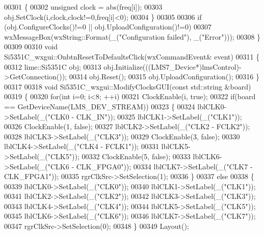 \begin{DoxyCode}
00301     \{
00302         \textcolor{keywordtype}{unsigned} clock = abs(freq[i]);
00303         obj.SetClock(i,clock,clock!=0,freq[i]<0);
00304     \}
00305 
00306     \textcolor{keywordflow}{if} (obj.ConfigureClocks()!=0 || obj.UploadConfiguration()!=0)
00307        wxMessageBox(wxString::Format(\_(\textcolor{stringliteral}{"Configuration failed"}), \_(\textcolor{stringliteral}{"Error"})));
00308 \}
00309 
00310 \textcolor{keywordtype}{void} Si5351C_wxgui::OnbtnResetToDefaultsClick(wxCommandEvent& event)
00311 \{
00312     lime::Si5351C obj;
00313     obj.Initialize(((LMS7_Device*)lmsControl)->GetConnection());
00314     obj.Reset();
00315     obj.UploadConfiguration();
00316 \}
00317 
00318 \textcolor{keywordtype}{void} Si5351C_wxgui::ModifyClocksGUI(\textcolor{keyword}{const} std::string &board)
00319 \{
00320     \textcolor{keywordflow}{for}(\textcolor{keywordtype}{int} i=0; i<8; ++i)
00321         ClockEnable(i, \textcolor{keyword}{true});
00322     \textcolor{keywordflow}{if}(board == GetDeviceName(LMS_DEV_STREAM))
00323     \{
00324         lblCLK0->SetLabel(\_(\textcolor{stringliteral}{"CLK0 - CLK\_IN"}));
00325         lblCLK1->SetLabel(\_(\textcolor{stringliteral}{"CLK1"}));
00326         ClockEnable(1, \textcolor{keyword}{false});
00327         lblCLK2->SetLabel(\_(\textcolor{stringliteral}{"CLK2 - FCLK2"}));
00328         lblCLK3->SetLabel(\_(\textcolor{stringliteral}{"CLK3"}));
00329         ClockEnable(3, \textcolor{keyword}{false});
00330         lblCLK4->SetLabel(\_(\textcolor{stringliteral}{"CLK4 - FCLK1"}));
00331         lblCLK5->SetLabel(\_(\textcolor{stringliteral}{"CLK5"}));
00332         ClockEnable(5, \textcolor{keyword}{false});
00333         lblCLK6->SetLabel(\_(\textcolor{stringliteral}{"CLK6 - CLK\_FPGA0"}));
00334         lblCLK7->SetLabel(\_(\textcolor{stringliteral}{"CLK7 - CLK\_FPGA1"}));
00335         rgrClkSrc->SetSelection(1);
00336     \}
00337     \textcolor{keywordflow}{else}
00338     \{
00339         lblCLK0->SetLabel(\_(\textcolor{stringliteral}{"CLK0"}));
00340         lblCLK1->SetLabel(\_(\textcolor{stringliteral}{"CLK1"}));
00341         lblCLK2->SetLabel(\_(\textcolor{stringliteral}{"CLK2"}));
00342         lblCLK3->SetLabel(\_(\textcolor{stringliteral}{"CLK3"}));
00343         lblCLK4->SetLabel(\_(\textcolor{stringliteral}{"CLK4"}));
00344         lblCLK5->SetLabel(\_(\textcolor{stringliteral}{"CLK5"}));
00345         lblCLK6->SetLabel(\_(\textcolor{stringliteral}{"CLK6"}));
00346         lblCLK7->SetLabel(\_(\textcolor{stringliteral}{"CLK7"}));
00347         rgrClkSrc->SetSelection(0);
00348     \}
00349     Layout();

\end{DoxyCode}
